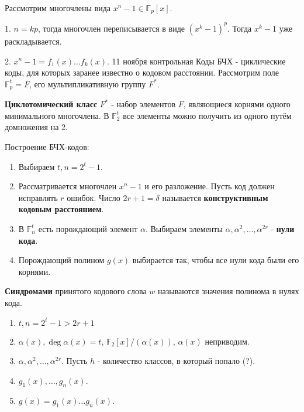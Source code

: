 \documentclass[11pt]{article}
\newcounter{th}\setcounter{th}{0}
\begin{document}
Рассмотрим многочлены вида $x^n - 1 \in \mathbb{F}_p[x]$.

1. $n = kp$, тогда многочлен переписывается в виде $(x^k - 1)^p$. Тогда $x^k - 1$ уже
раскладывается.

2. $x^n - 1 = f_1(x)\ldots f_k(x)$.
11 ноября контрольная
Коды БЧХ - циклические коды, для которых заранее известно о кодовом расстоянии. Рассмотрим поле \(\mathbb{F}_p^t = F\), его мультипликативную группу \(F^*\).

\textbf{Циклотомический класс} \(F^*\) - набор элементов \(F\), являющиеся корнями одного минимального многочлена. В \(\mathbb{F}^t_2\) все элементы можно получить из одного путём домножения на 2.

Построение БЧХ-кодов:
\begin{enumerate}
\item Выбираем \(t, n = 2^t - 1\).
\item Рассматривается многочлен \(x^n - 1\) и его разложение. Пусть код должен исправлять \(r\) ошибок. Число \(2r + 1 = \delta\) называется \textbf{конструктивным кодовым расстоянием}.
\item В \(\mathbb{F}^t_n\) есть порождающий элемент \(\alpha\). Выбираем элементы \(\alpha, \alpha^2, \ldots, \alpha^{2r}\) - \textbf{нули кода}.
\item Порождающий полином \(g(x)\) выбирается так, чтобы все нули кода были его корнями.
\end{enumerate}
\textbf{Синдромами} принятого кодового слова \(w\) называются значения полинома в нулях кода.
\begin{enumerate}
\item \(t, n = 2^t - 1 > 2r + 1\)
\item \(\alpha(x), \operatorname{deg}\alpha(x) = t\), \(\mathbb{F}_2[x] / (\alpha(x))\), \(\alpha(x)\) неприводим.
\item \(\alpha, \alpha^2, \ldots, \alpha^{2r}\). Пусть \(h\) - количество классов, в который попало (?).
\item \(g_1(x), \ldots, g_n(x)\).
\item \(g(x) = g_1(x)\ldots g_n(x)\).
\end{enumerate}
\end{document}
